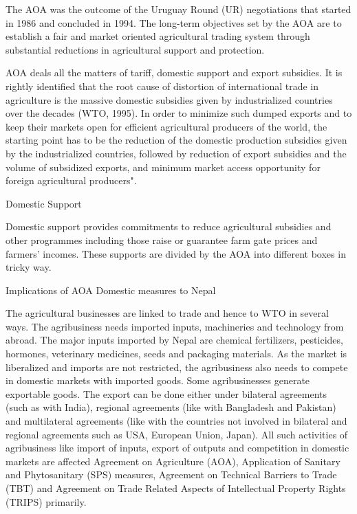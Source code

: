 \documentclass[]{book}
\begin{document}
The AOA was the outcome of the Uruguay Round (UR) negotiations that started in 1986 and concluded in 1994. The long-term objectives set by the AOA are to establish a fair and market oriented agricultural trading system through substantial reductions in agricultural support and protection.

AOA deals all the matters of tariff, domestic support and export subsidies. It is rightly identified that the root cause of distortion of international trade in agriculture is the massive domestic subsidies given by industrialized countries over the decades (WTO, 1995). In order to minimize such dumped exports and to keep their markets open for efficient agricultural producers of the world, the starting point has to be the reduction of the domestic production subsidies given by the industrialized countries, followed by reduction of export subsidies and the volume of subsidized exports, and minimum market access opportunity for foreign agricultural producers".

Domestic Support

Domestic support provides commitments to reduce agricultural subsidies and other programmes including those raise or guarantee farm gate prices and farmers' incomes. These supports are divided by the AOA into different boxes in tricky way.

Implications of AOA Domestic measures to Nepal

The agricultural businesses are linked to trade and hence to WTO in several ways. The agribusiness needs imported inputs, machineries and technology from abroad. The major inputs imported by Nepal are chemical fertilizers, pesticides, hormones, veterinary medicines, seeds and packaging materials. As the market is liberalized and imports are not restricted, the agribusiness also needs to compete in domestic markets with imported goods. Some agribusinesses generate exportable goods. The export can be done either under bilateral agreements (such as with India), regional agreements (like with Bangladesh and Pakistan) and multilateral agreements (like with the countries not involved in bilateral and regional agreements such as USA, European Union, Japan). All such activities of agribusiness like import of inputs, export of outputs and competition in domestic markets are affected Agreement on Agriculture (AOA), Application of Sanitary and Phytosanitary (SPS) measures, Agreement on Technical Barriers to Trade (TBT) and Agreement on Trade Related Aspects of Intellectual Property Rights (TRIPS) primarily.
\end{document}
